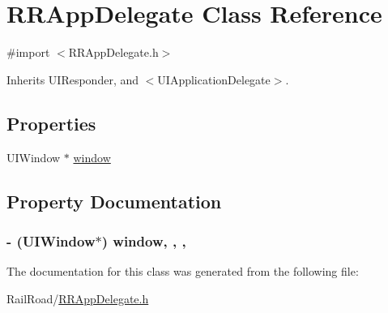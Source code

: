 \hypertarget{interface_r_r_app_delegate}{\section{R\-R\-App\-Delegate Class Reference}
\label{interface_r_r_app_delegate}
}


{\ttfamily \#import $<$R\-R\-App\-Delegate.\-h$>$}



Inherits U\-I\-Responder, and $<$\-U\-I\-Application\-Delegate$>$.

\subsection*{Properties}
\begin{DoxyCompactItemize}
\item 
U\-I\-Window $\ast$ \hyperlink{interface_r_r_app_delegate_a4a2585f31cfcd367e967e70275b5a34f}{window}
\end{DoxyCompactItemize}


\subsection{Property Documentation}
\hypertarget{interface_r_r_app_delegate_a4a2585f31cfcd367e967e70275b5a34f}{
\subsubsection[{window}]{\setlength{\rightskip}{0pt plus 5cm}-\/ (U\-I\-Window$\ast$) window\hspace{0.3cm}{\ttfamily [read]}, {\ttfamily [write]}, {\ttfamily [nonatomic]}, {\ttfamily [strong]}}}\label{interface_r_r_app_delegate_a4a2585f31cfcd367e967e70275b5a34f}


The documentation for this class was generated from the following file\-:\begin{DoxyCompactItemize}
\item 
Rail\-Road/\hyperlink{_r_r_app_delegate_8h}{R\-R\-App\-Delegate.\-h}\end{DoxyCompactItemize}

